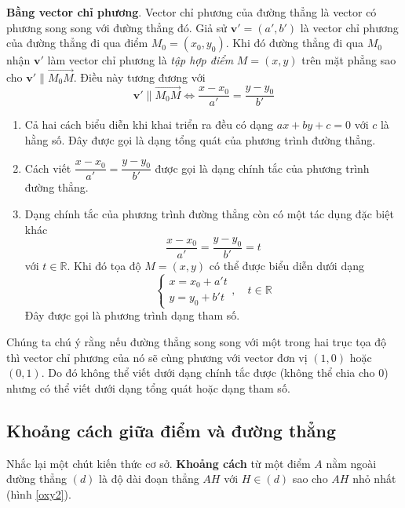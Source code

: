 \textbf{Bằng vector chỉ phương}. Vector chỉ phương của đường thẳng là vector có phương song song với đường thẳng đó. Giả sử $\bm{v}' = (a', b')$ là vector chỉ phương của đường thẳng đi qua điểm $M_0 = (x_0, y_0)$. Khi đó đường thẳng đi qua $M_0$ nhận $\bm{v}'$ làm vector chỉ phương là \textit{tập hợp điểm} $M = (x, y)$ trên mặt phẳng sao cho $\bm{v}' \parallel \overrightarrow{M_0 M}$. Điều này tương đương với
\begin{equation}
	\bm{v}' \parallel \overrightarrow{M_0 M} \Leftrightarrow \frac{x - x_0}{a'} = \frac{y - y_0}{b'}
\end{equation}

\begin{enumerate}[leftmargin=*]
	\item Cả hai cách biểu diễn khi khai triển ra đều có dạng $a x + by + c = 0$ với $c$ là hằng số. Đây được gọi là dạng tổng quát của phương trình đường thẳng. 
	
	\item Cách viết $\dfrac{x - x_0}{a'} = \dfrac{y - y_0}{b'}$ được gọi là dạng chính tắc của phương trình đường thẳng.
	
	\item Dạng chính tắc của phương trình đường thẳng còn có một tác dụng đặc biệt khác \[\frac{x - x_0}{a'} = \frac{y - y_0}{b'} = t\] với $t \in \mathbb{R}$. Khi đó tọa độ $M = (x, y)$ có thể được biểu diễn dưới dạng
	\begin{equation}
		\begin{cases}
			x = x_0 + a' t \\ y = y_0 + b' t
		\end{cases}, \quad t \in \mathbb{R}
	\end{equation}
	Đây được gọi là phương trình dạng tham số.
\end{enumerate}

Chúng ta chú ý rằng nếu đường thẳng song song với một trong hai trục tọa độ thì vector chỉ phương của nó sẽ cùng phương với vector đơn vị $(1, 0)$ hoặc $(0, 1)$. Do đó không thể viết dưới dạng chính tắc được (không thể chia cho 0) nhưng có thể viết dưới dạng tổng quát hoặc dạng tham số.

\subsection{Khoảng cách giữa điểm và đường thẳng}

Nhắc lại một chút kiến thức cơ sở. \textbf{Khoảng cách} từ một điểm $A$ nằm ngoài đường thẳng $(d)$ là độ dài đoạn thẳng $AH$ với $H \in (d)$ sao cho $AH$ nhỏ nhất (hình \ref{oxy2}).

